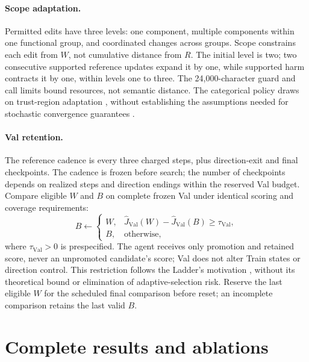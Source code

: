 \paragraph{Scope adaptation.}
Permitted edits have three levels: one component, multiple components within one functional group, and coordinated changes across groups.
Scope constrains each edit from $W$, not cumulative distance from $R$.
The initial level is two; two consecutive supported reference updates expand it by one, while supported harm contracts it by one, within levels one to three.
The 24,000-character guard and call limits bound resources, not semantic distance.
The categorical policy draws on trust-region adaptation \citep{conn2000trust}, without establishing the assumptions needed for stochastic convergence guarantees \citep{bandeira2014probabilistic,chen2018storm,blanchet2019trust}.

\paragraph{Val retention.}
The reference cadence is every three charged steps, plus direction-exit and final checkpoints.
The cadence is frozen before search; the number of checkpoints depends on realized steps and direction endings within the reserved Val budget.
Compare eligible $W$ and $B$ on complete frozen Val under identical scoring and coverage requirements:
\begin{equation}
 B\leftarrow
 \begin{cases}
 W,&\widehat J_{\mathrm{Val}}(W)-\widehat J_{\mathrm{Val}}(B)\geq\tau_{\mathrm{Val}},\\
 B,&\text{otherwise},
 \end{cases}
 \label{eq:acceptance}
\end{equation}
where $\tau_{\mathrm{Val}}>0$ is prespecified.
The agent receives only promotion and retained score, never an unpromoted candidate's score; Val does not alter Train states or direction control.
This restriction follows the Ladder's motivation \citep{blum2015ladder}, without its theoretical bound or elimination of adaptive-selection risk.
Reserve the last eligible $W$ for the scheduled final comparison before reset; an incomplete comparison retains the last valid $B$.

\section{Complete results and ablations}
\label{app:results}
